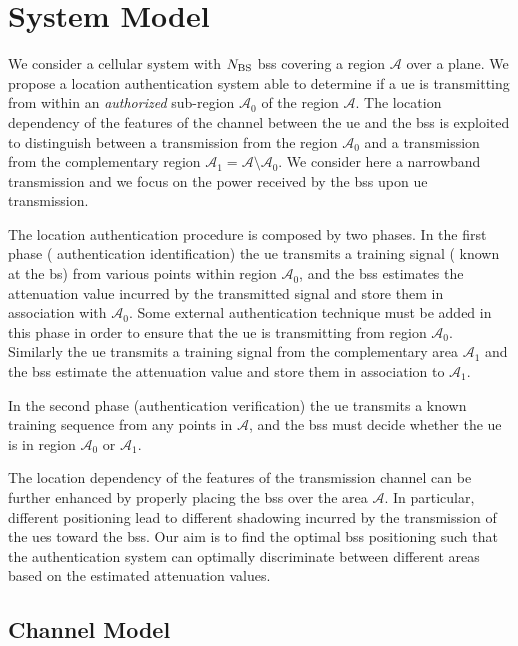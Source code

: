 \documentclass[twocolumns]{IEEEtran}
\begin{document}
\section{System Model}


We consider a cellular system with $N_{\rm BS}$ \acp{bs} covering a region $\mathcal{A}$ over a plane. We propose a location authentication system able to determine if a \ac{ue} is transmitting from within an {\em authorized} sub-region $\mathcal{A}_0$ of the region $\mathcal{A}$. The location dependency of the features of the channel between the \ac{ue} and the \acp{bs} is exploited to distinguish between a transmission from the region $\mathcal{A_0}$ and a transmission from the complementary region $\mathcal{A}_1=\mathcal{A} \setminus \mathcal{A}_0$. We consider here a narrowband transmission and we focus on the power received by the \acp{bs} upon \ac{ue} transmission.

The location authentication procedure is composed by two phases. In the first phase ( authentication identification) the \ac{ue} transmits a training signal ( known at the \acs{bs}) from various points within region $\mathcal{A}_0$, and the \acp{bs} estimates the attenuation value incurred by the transmitted signal and store them in association with $\mathcal{A}_0$. Some external authentication technique must be added in this phase in order to ensure that the \ac{ue} is transmitting from region $\mathcal{A}_0$. Similarly the \ac{ue} transmits a training signal from the complementary area $\mathcal{A}_1$ and the \acp{bs} estimate the attenuation value and store them in association to $\mathcal{A}_1$.

In the second phase (authentication verification) the \ac{ue} transmits a known training sequence from any points in $\mathcal{A}$, and the \acp{bs} must decide whether the \ac{ue} is in region $\mathcal{A}_0$ or $\mathcal{A}_1$.

The location dependency of the features of the transmission channel can be further enhanced by properly placing the \acp{bs} over the area $\mathcal{A}$. In particular, different positioning lead to different shadowing incurred by the transmission of the \acp{ue} toward the \acp{bs}. Our aim is to find the optimal \acp{bs} positioning such that the authentication system can optimally discriminate between different areas based on the estimated attenuation values.

\subsection{Channel Model}
\end{document}
